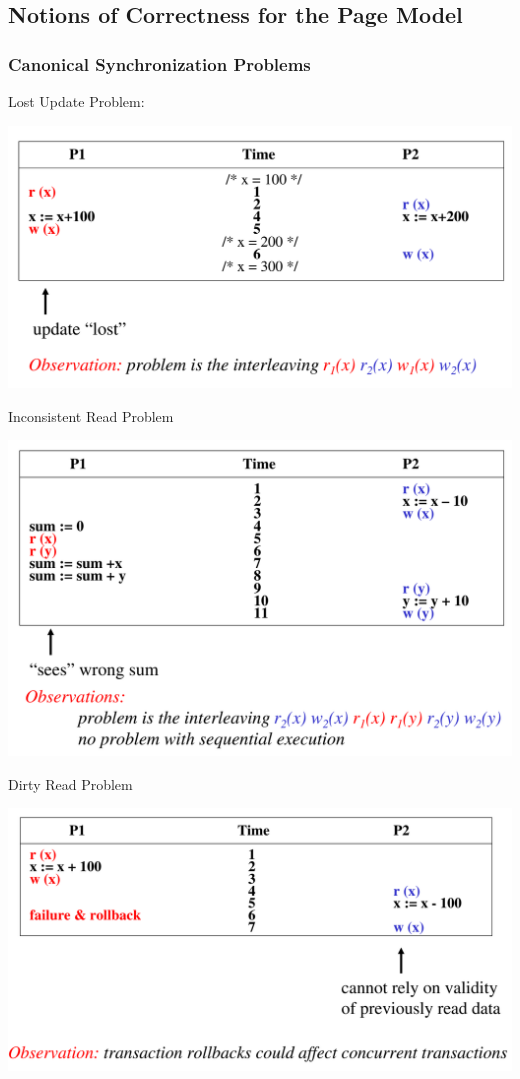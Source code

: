 \documentclass[11pt]{article}
\begin{document}
\subsection{Notions of Correctness for the Page Model}
\label{sec:org8d5f3f8}
\subsubsection{Canonical Synchronization Problems}
\label{sec:orgf915e86}

Lost Update Problem:
\begin{center}
\includegraphics[width=.8\textwidth]{../images/bigdatabase/2.png}
\label{}
\end{center}

Inconsistent Read Problem
\begin{center}
\includegraphics[width=.8\textwidth]{../images/bigdatabase/3.png}
\label{}
\end{center}

Dirty Read Problem
\begin{center}
\includegraphics[width=.8\textwidth]{../images/bigdatabase/4.png}
\label{}
\end{center}
\end{document}
